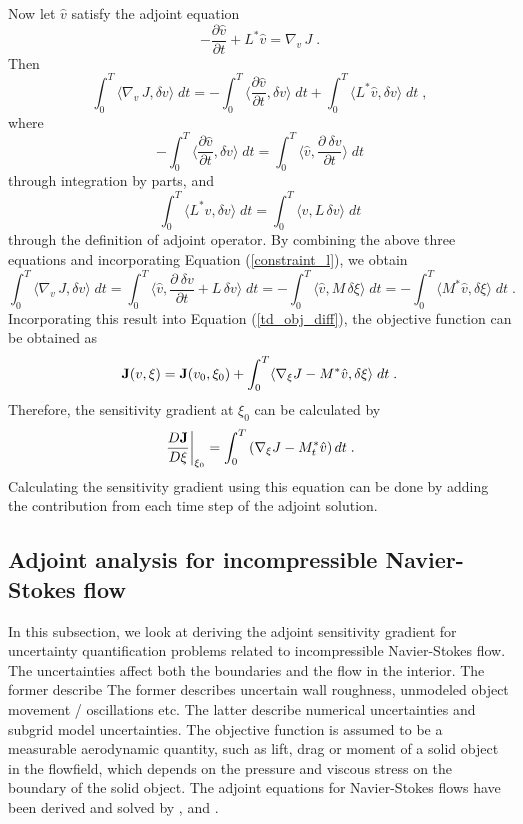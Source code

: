 Now let $\hat v$ satisfy the adjoint equation
$$ -\frac{\partial {\hat v}}{\partial t} + L^* {\hat v} = \nabla_v\, J \;.$$
Then
$$ \int_0^T \langle \nabla_{v}\, J, \delta v \rangle \; dt
 = - \int_0^T \langle \frac{\partial {\hat v}}{\partial t},
                      \delta v \rangle \; dt
   + \int_0^T \langle L^* {\hat v}, \delta v \rangle \; dt \;, $$
where 
$$ - \int_0^T \langle \frac{\partial {\hat v}}{\partial t},
                      \delta v \rangle \; dt
   = \int_0^T \langle \hat v, \frac{\partial\: {\delta v}}{\partial t}
              \rangle \; dt $$
through integration by parts, and
$$ \int_0^T \langle L^* {\hat v}, \delta v \rangle \; dt
 = \int_0^T \langle {\hat v}, L\, \delta v \rangle \; dt $$
through the definition of adjoint operator.  By combining the above three
equations and incorporating Equation (\ref{constraint_l}), we obtain
$$ \int_0^T \langle \nabla_{v}\, J, \delta v \rangle \; dt
 = \int_0^T \langle \hat v, \frac{\partial\: {\delta v}}{\partial t} +
                            L\, \delta v \rangle \; dt
 =-\int_0^T \langle \hat v, M\, \delta \xi \rangle \; dt
 =-\int_0^T \langle M^* \hat v, \delta \xi \rangle \; dt \;.$$
Incorporating this result into Equation (\ref{td_obj_diff}),
the objective function can be obtained as
$$ {\bf J}(v,\xi) = {\bf J}(v_0,\xi_0)
 + \int_0^T \langle \nabla_{\xi} J - M^* {\hat v}, \delta \xi
            \rangle\; dt \;.$$
Therefore, the sensitivity gradient at $\xi_0$ can be calculated by
\begin{equation} \label{sensitivity_unsteady}
 \left.\frac{D{\bf J}}{D\xi}\right|_{\xi_0} = 
 \int_0^T \left(\nabla_{\xi} J - M_t^* {\hat v}\right) dt \;.
\end{equation}
Calculating the sensitivity gradient using this equation can be done by
adding the contribution from each time step of the adjoint solution.



\subsection{Adjoint analysis for incompressible Navier-Stokes flow}
\label{s:adj_ns}

In this subsection, we look at deriving the adjoint sensitivity gradient
for uncertainty quantification problems related to
incompressible Navier-Stokes flow.  The uncertainties affect
both the boundaries and the flow in the interior.  The former describe
The former describes
uncertain wall roughness, unmodeled object movement / oscillations etc.
The latter describe numerical uncertainties and subgrid model uncertainties.
The objective function is assumed to be a measurable aerodynamic quantity, such
as lift, drag or moment of a solid object in the flowfield, which depends on
the pressure and viscous stress on the boundary of the solid object.
The adjoint equations for Navier-Stokes flows have been derived and solved
by \cite{jameson1988}, \cite{bewley01} and \cite{temam}.

